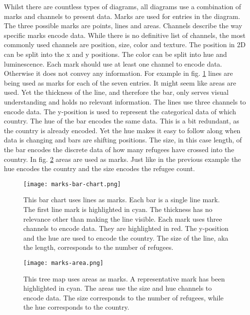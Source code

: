 Whilst there are countless types of diagrams, all diagrams use a combination of marks and channels to present data. Marks are used for entries in the diagram. The three possible marks are points, lines and areas. Channels describe the way specific marks encode data. While there is no definitive list of channels, the most commonly used channels are position, size, color and texture. The position in 2D can be split into the x and y positions. The color can be split into hue and luminescence. Each mark should use at least one channel to encode data. Otherwise it does not convey any information. For example in fig. \ref{fig:bar-chart} lines are being used as marks for each of the seven entries. It might seem like areas are used. Yet the thickness of the line, and therefore the bar, only serves visual understanding and holds no relevant information. The lines use three channels to encode data. The y-position is used to represent the categorical data of which country. The hue of the bar encodes the same data. This is a bit redundant, as the country is already encoded. Yet the hue makes it easy to follow along when data is changing and bars are shifting positions. The size, in this case length, of the bar encodes the discrete data of how many refugees have crossed into the country. In fig. \ref{fig:marks-area} areas are used as marks. Just like in the previous example the hue encodes the country and the size encodes the refugee count. 

\begin{figure}[ht]
    \texttt{[image: marks-bar-chart.png]}
    \captionsetup{width=0.9\textwidth}
    \caption[bar-chart]{This bar chart uses lines as marks. Each bar is a single line mark. The first line mark is highlighted in cyan. The thickness has no relevance other than making the line visible. Each mark uses three channels to encode data. They are highlighted in red. The y-position and the hue are used to encode the country. The size of the line, aka the length, corresponds to the number of refugees.}
    \label{fig:bar-chart}
\end{figure}

\begin{figure}[ht]
    \texttt{[image: marks-area.png]}
    \captionsetup{width=0.9\textwidth}
    \caption[marks-area]{This tree map uses areas as marks. A representative mark has been highlighted in cyan. The areas use the size and hue channels to encode data. The size corresponds to the number of refugees, while the hue corresponds to the country.}
    \label{fig:marks-area}
\end{figure}

